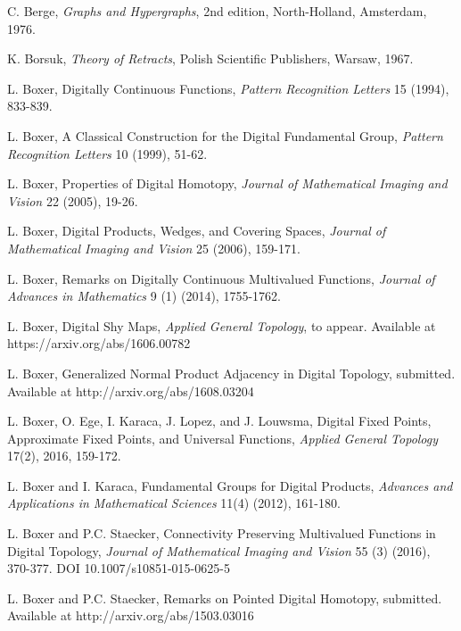 \documentclass{article}
\theoremstyle{plain}
\theoremstyle{definition}
\numberwithin{thm}{section}
\begin{document}
\begin{thebibliography}{11}

C. Berge,
{\em Graphs and Hypergraphs}, 2nd edition, North-Holland, Amsterdam, 1976.

K. Borsuk,
{\em Theory of Retracts},
Polish Scientific Publishers, Warsaw, 1967.

L. Boxer,
Digitally Continuous Functions,
{\em Pattern Recognition Letters} 15 (1994), 833-839.

L. Boxer,
A Classical Construction for the Digital Fundamental Group,
{\em Pattern Recognition Letters} 10 (1999), 51-62.

L. Boxer,
Properties of Digital Homotopy,
{\em Journal of Mathematical Imaging and Vision} 22 (2005),
19-26.

L. Boxer, Digital Products, Wedges, and Covering Spaces,
{\em Journal of Mathematical Imaging and Vision} 25 (2006), 159-171.

L. Boxer,
Remarks on Digitally Continuous Multivalued Functions,
{\em Journal of Advances in Mathematics}
9 (1) (2014), 1755-1762.

L. Boxer,
Digital Shy Maps,
{\em Applied General Topology}, to appear. Available at https://arxiv.org/abs/1606.00782

L. Boxer, Generalized Normal Product Adjacency in Digital Topology, submitted. Available at
http://arxiv.org/abs/1608.03204

L. Boxer, O. Ege, I. Karaca, J. Lopez, and J. Louwsma, Digital Fixed Points, Approximate Fixed Points, and Universal Functions, 
{\em Applied General Topology}
17(2), 2016, 159-172.

L. Boxer and I. Karaca,
Fundamental Groups for Digital Products,
{\em Advances and Applications in Mathematical Sciences} 11(4) (2012), 161-180.

L. Boxer and P.C. Staecker,
Connectivity Preserving Multivalued Functions in Digital Topology,
{\em Journal of Mathematical Imaging and Vision} 55 (3) (2016), 370-377.
DOI 10.1007/s10851-015-0625-5

L. Boxer and P.C. Staecker, Remarks on Pointed Digital Homotopy, submitted.  Available at
http://arxiv.org/abs/1503.03016



\end{thebibliography}
\end{document}
